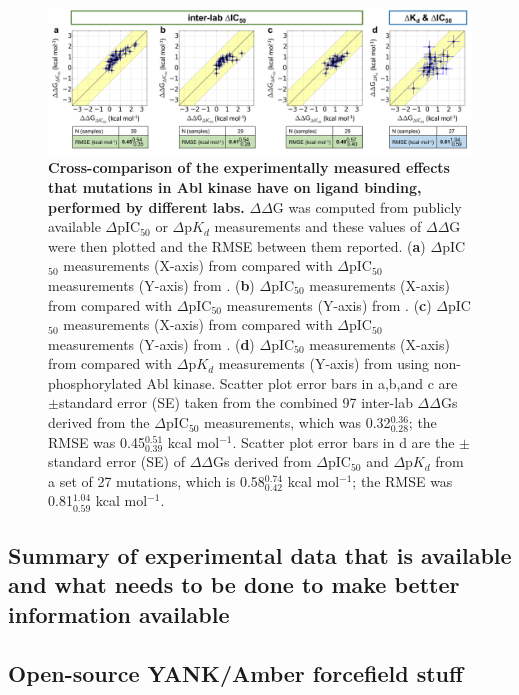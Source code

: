 \documentclass[phd,tocprelim]{cornell}
\begin{document}
%
%
\begin{landscape}
\begin{figure}[p]
\centering
\includegraphics[width=0.95\linewidth]{figures/abl-figure-2.pdf}
\caption[Cross-comparison of the experimentally measured effects that mutations in Abl kinase have on ligand binding, performed by different labs.]{
{\bf Cross-comparison of the experimentally measured effects that mutations in Abl kinase have on ligand binding, performed by different labs.}
$\Delta\Delta$G was computed from publicly available $\Delta$pIC$_{50}$ or $\Delta$p$K_{d}$ measurements and these values of $\Delta\Delta$G were then plotted and the RMSE between them reported.
({\bf a}) $\Delta$pIC$_{50}$ measurements (X-axis) from \protect\cite{Gozgit3992} compared with $\Delta$pIC$_{50}$ measurements (Y-axis) from \protect\cite{Soverini7374}.
({\bf b}) $\Delta$pIC$_{50}$ measurements (X-axis) from \protect\cite{Gozgit3992} compared with $\Delta$pIC$_{50}$ measurements (Y-axis) from \protect\cite{o2007bcr}.
({\bf c}) $\Delta$pIC$_{50}$ measurements (X-axis) from \protect\cite{Soverini7374} compared with $\Delta$pIC$_{50}$ measurements (Y-axis) from \protect\cite{o2007bcr}.
({\bf d}) $\Delta$pIC$_{50}$ measurements (X-axis) from \protect\cite{Gozgit3992} compared with $\Delta$p$K_{d}$ measurements (Y-axis) from \protect\cite{Davis:Nat.Biotechnol.:2011} using non-phosphorylated Abl kinase.
Scatter plot error bars in a,b,and c are $\pm$standard error (SE) taken from the combined 97 inter-lab $\Delta\Delta$Gs derived from the $\Delta$pIC$_{50}$ measurements, which was 0.32$_{0.28}^{0.36}$;
the RMSE was 0.45$_{0.39}^{0.51}$ kcal mol$^{-1}$. Scatter plot error bars in d are the $\pm$standard error (SE) of $\Delta\Delta$Gs derived from $\Delta$pIC$_{50}$ and $\Delta$p$K_{d}$ from a set of 27 mutations, which is 0.58$_{0.42}^{0.74}$ kcal mol$^{-1}$;
the RMSE was 0.81$_{0.59}^{1.04}$ kcal mol$^{-1}$.
}
\label{fig:abl-figure-2}
\end{figure}
\end{landscape}




\subsection{Summary of experimental data that is available and what needs to be done to make better information available}
\subsection{Open-source YANK/Amber forcefield stuff}




\end{document}
